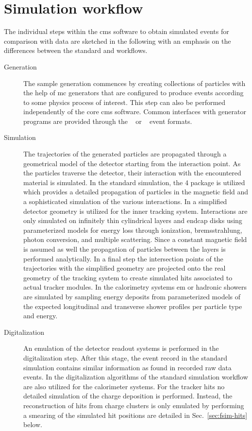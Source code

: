 \section{Simulation workflow}
\label{sec:fsim-workflow}

The individual steps within the \gls{cms} software to obtain simulated events for comparison with data are sketched in the following with an emphasis on the differences between the standard and \FSIM workflows.

\begin{description}
\item[Generation] The sample generation commences by creating collections of particles with the help of \acrfull{mc} generators that are configured to produce events according to some physics process of interest. This step can also be performed independently of the core \gls{cms} software. Common interfaces with generator programs are provided through the \HEPMC[format=hyperbf]~\cite{Dobbs:2001ck} or \LHEF[format=hyperbf]~\cite{Alwall:2006yp} event formats.

\item[Simulation] The trajectories of the generated particles are propagated through a geometrical model of the detector starting from the interaction point. As the particles traverse the detector, their interaction with the encountered material is simulated. In the standard simulation, the \GEANT{}4 package is utilized which provides a detailed propagation of particles in the magnetic field and a sophisticated simulation of the various interactions. 
In \FSIM a simplified detector geometry is utilized for the inner tracking system. Interactions are only simulated on infinitely thin cylindrical layers and endcap disks using parameterized models for energy loss through ionization, bremsstrahlung, photon conversion, and multiple scattering. Since a constant magnetic field is assumed as well the propagation of particles between the layers is performed analytically. In a final step the intersection points of the trajectories with the simplified geometry are projected onto the real geometry of the tracking system to create simulated hits associated to actual tracker modules. In the calorimetry systems \gls{em} or hadronic showers are simulated by sampling energy deposits from parameterized models of the expected longitudinal and transverse shower profiles per particle type and energy.

\item[Digitalization] An emulation of the detector readout systems is performed in the digitalization step. After this stage, the event record in the standard simulation contains similar information as found in recorded raw data events. In \FSIM the digitalization algorithms of the standard simulation workflow are also utilized for the calorimeter systems. For the tracker hits no detailed simulation of the charge deposition is performed. Instead, the reconstruction of hits from charge clusters is only emulated by performing a smearing of the simulated hit positions are detailed in Sec.~\ref{sec:fsim-hits} below.


\end{description}
